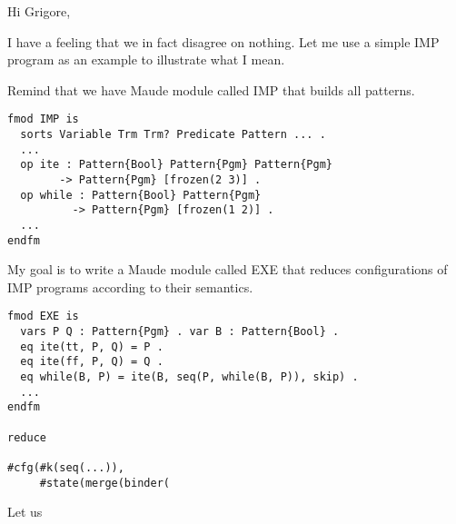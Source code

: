 \documentclass{article}
\begin{document}
Hi Grigore,

I have a feeling that we in fact disagree on nothing. Let me use a simple IMP program as an example to illustrate what I mean. 

Remind that we have Maude module called IMP that builds all patterns. 


\lstset{style=code}

\begin{lstlisting}
fmod IMP is
  sorts Variable Trm Trm? Predicate Pattern ... .
  ...
  op ite : Pattern{Bool} Pattern{Pgm} Pattern{Pgm} 
        -> Pattern{Pgm} [frozen(2 3)] .
  op while : Pattern{Bool} Pattern{Pgm} 
          -> Pattern{Pgm} [frozen(1 2)] .
  ...
endfm

\end{lstlisting}

My goal is to write a Maude module called EXE that reduces configurations of IMP programs according to their semantics. 

\lstset{style=code}

\begin{lstlisting}
fmod EXE is
  vars P Q : Pattern{Pgm} . var B : Pattern{Bool} .
  eq ite(tt, P, Q) = P .
  eq ite(ff, P, Q) = Q .
  eq while(B, P) = ite(B, seq(P, while(B, P)), skip) .
  ...
endfm

reduce

#cfg(#k(seq(...)),
     #state(merge(binder(

\end{lstlisting}

Let us 
\end{document}
